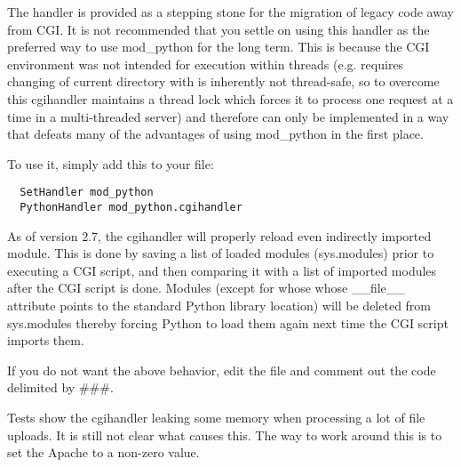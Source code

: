 The handler is provided as a stepping stone for the migration of
legacy code away from CGI. It is not recommended that you settle on
using this handler as the preferred way to use mod_python for the long
term. This is because the CGI environment was not intended for
execution within threads (e.g. requires changing of current directory
with is inherently not thread-safe, so to overcome this cgihandler
maintains a thread lock which forces it to process one request at a
time in a multi-threaded server) and therefore can only be implemented
in a way that defeats many of the advantages of using mod_python in
the first place.

To use it, simply add this to your  file: 

\begin{verbatim}
  SetHandler mod_python
  PythonHandler mod_python.cgihandler
\end{verbatim}

As of version 2.7, the cgihandler will properly reload even indirectly
imported module. This is done by saving a list of loaded modules
(sys.modules) prior to executing a CGI script, and then comparing it
with a list of imported modules after the CGI script is done.  Modules
(except for whose whose __file__ attribute points to the standard
Python library location) will be deleted from sys.modules thereby
forcing Python to load them again next time the CGI script imports
them.

If you do not want the above behavior, edit the 
file and comment out the code delimited by \#\#\#.

Tests show the cgihandler leaking some memory when processing a lot of
file uploads. It is still not clear what causes this. The way to work
around this is to set the Apache  to a non-zero
value.


